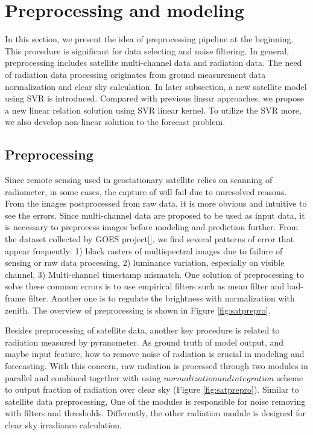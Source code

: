 \documentclass[conference]{IEEEtran}
\begin{document}
\section{Preprocessing and modeling} %
\label{sec:modeling}
In this section, we present the idea of preprocessing pipeline at the beginning.
This procedure is significant for data selecting and noise filtering. In general, preprocessing
includes satellite multi-channel data and radiation data. The need of
radiation data processing originates from ground measurement data normalization
and clear sky calculation.  In later subsection, a new satellite model using SVR
is introduced. Compared with previous linear approaches, we propose a new linear
relation solution using SVR linear kernel. To utilize the SVR more, we also
develop non-linear solution to the forecast problem.


\subsection{Preprocessing}
\label{subsec:preprocessing}
Since remote sensing used in geostationary satellite relies on scanning of
radiometer, in some cases, the capture of will fail due to unresolved reasons.
From the images postprocessed from raw data, it is more obvious and intuitive to
see the errors. Since multi-channel data are proposed to be used as input data,
it is necessary to preprocess images before modeling and prediction further.
From the dataset collected by GOES project[], we find several patterns of error
that appear frequently: 1) black rasters of multispectral images due to failure
of sensing or raw data processing, 2) luminance variation, especially on visible
channel, 3) Multi-channel timestamp mismatch. One solution of preprocessing to
solve these common errors is to use empirical filters such as mean filter and
bad-frame filter. Another one is to regulate the brightness with normalization
with zenith. The overview of preprocessing is shown in Figure
\ref{fig:satprepro}.

Besides preprocessing of satellite data, another key procedure is related to
radiation measured by pyranometer. As ground truth of model output, and maybe
input feature, how to remove noise of radiation is crucial in modeling and
forecasting. With this concern, raw radiation is processed through two modules
in parallel and combined together with using $normalization and integration$
scheme to output fraction of radiation over clear
sky (Figure \ref{fig:satprepro}). Similar to satellite data preprocessing, One
of the modules is responsible for noise removing with filters and thresholds.
Differently, the other radiation module is designed for clear sky irradiance
calculation. 
\end{document}
